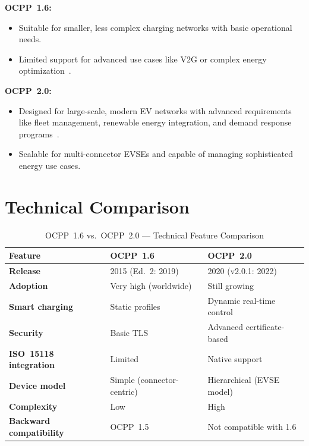 \documentclass[12pt,a4paper]{report}
\begin{document}
\textbf{OCPP~1.6:}
\begin{itemize}
  \item Suitable for smaller, less complex charging networks with basic operational needs.
  \item Limited support for advanced use cases like V2G or complex energy
        optimization~\autocite{luxman2024}.
\end{itemize}
\noindent
\textbf{OCPP~2.0:}
\begin{itemize}
  \item Designed for large-scale, modern EV networks with advanced requirements like fleet
        management, renewable energy integration, and demand response programs~\autocite{ampcontrol2024}.
  \item Scalable for multi-connector EVSEs and capable of managing sophisticated energy use
        cases.
\end{itemize}

\section{Technical Comparison}

\begin{table}[h!]
  \centering
  \caption{OCPP~1.6 vs.\ OCPP~2.0 --- Technical Feature Comparison}
  \label{tab:ocpp-comparison}
  \renewcommand{\arraystretch}{1.35}
  \begin{tabular}{|>{\bfseries}p{5cm}|p{4.5cm}|p{4.5cm}|}
    \hline
    Feature                   & OCPP~1.6~\autocite{ocpp16_ed2}  & OCPP~2.0~\autocite{ocpp201} \\ \hline
    Release                   & 2015 (Ed.~2: 2019)          & 2020 (v2.0.1: 2022) \\ \hline
    Adoption                  & Very high (worldwide)       & Still growing \\ \hline
    Smart charging            & Static profiles             & Dynamic real-time control \\ \hline
    Security                  & Basic TLS                   & Advanced certificate-based \\ \hline
    ISO~15118 integration     & Limited                     & Native support \\ \hline
    Device model              & Simple (connector-centric)  & Hierarchical (EVSE model) \\ \hline
    Complexity                & Low                         & High \\ \hline
    Backward compatibility    & OCPP~1.5                    & Not compatible with 1.6 \\ \hline
  \end{tabular}
\end{table}
\end{document}
